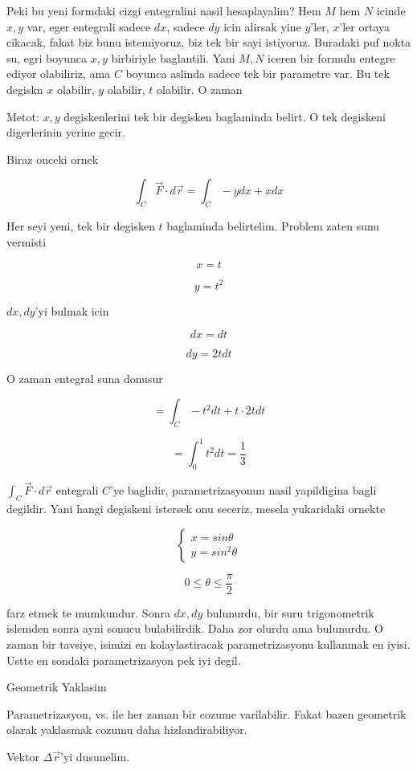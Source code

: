 \documentclass[12pt,fleqn]{article}
\begin{document}
Peki bu yeni formdaki cizgi entegralini nasil hesaplayalim? Hem $M$ hem $N$
icinde $x,y$ var, eger entegrali sadece $dx$, sadece $dy$ icin alirsak yine
$y$'ler, $x$'ler ortaya cikacak, fakat biz bunu istemiyoruz, biz tek bir
sayi istiyoruz. Buradaki puf nokta su, egri boyunca $x,y$ birbiriyle
baglantili. Yani $M,N$ iceren bir formulu entegre ediyor olabiliriz, ama
$C$ boyunca aslinda sadece tek bir parametre var. Bu tek degiskn $x$
olabilir, $y$ olabilir, $t$ olabilir. O zaman 

Metot: $x,y$ degiskenlerini tek bir degisken baglaminda belirt. O tek degiskeni
digerlerinin yerine gecir. 

Biraz onceki ornek

\[ \int_C \vec{F} \cdot d\vec{r} 
= \int_C -y dx + x dx
\]

Her seyi yeni, tek bir degisken $t$ baglaminda belirtelim. Problem zaten
sunu vermisti

\[ x = t  \]

\[ y = t^2 \]

$dx,dy$'yi bulmak icin

\[ dx = dt \]

\[ dy = 2tdt \]

O zaman entegral suna donusur

\[ = \int_C -t^2 dt + t \cdot 2t dt\]

\[ = \int_0^1 t^2 dt = \frac{1}{3}\]


$\int_C \vec{F} \cdot d\vec{r}$ entegrali $C$'ye baglidir, parametrizasyonun nasil 
yapildigina bagli degildir. Yani hangi degiskeni istersek onu seceriz,
mesela yukaridaki ornekte 

\[ 
\left\{ \begin{array}{l}
x  = sin\theta \\
y  = sin^2\theta 
\end{array} \right.
 \]

\[ 0 \le \theta \le \frac{\pi}{2} \]

farz etmek te mumkundur. Sonra $dx,dy$ bulunurdu, bir suru trigonometrik
islemden sonra ayni sonucu bulabilirdik. Daha zor olurdu ama bulunurdu. O
zaman bir tavsiye, isimizi en kolaylastiracak parametrizasyonu kullanmak en
iyisi. Ustte en sondaki parametrizasyon pek iyi degil. 

Geometrik Yaklasim

Parametrizasyon, vs. ile her zaman bir cozume varilabilir. Fakat bazen
geometrik olarak yaklasmak cozumu daha hizlandirabiliyor. 

Vektor $\Delta \vec{r}$'yi dusunelim. 
\end{document}
